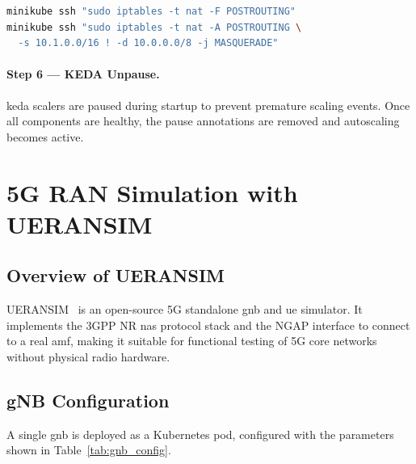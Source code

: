 \begin{lstlisting}[language=bash, caption={Configuring NAT masquerading for UE traffic}, label={lst:iptables_nat}]
minikube ssh "sudo iptables -t nat -F POSTROUTING"
minikube ssh "sudo iptables -t nat -A POSTROUTING \
  -s 10.1.0.0/16 ! -d 10.0.0.0/8 -j MASQUERADE"
\end{lstlisting}

\paragraph{Step 6 — KEDA Unpause.} \gls{keda} scalers are paused during startup to prevent premature scaling events. Once all components are healthy, the pause annotations are removed and autoscaling becomes active.

\section{5G RAN Simulation with UERANSIM}
\label{sec:ueransim_deploy}

\subsection{Overview of UERANSIM}

UERANSIM~\cite{ueransim} is an open-source 5G standalone \gls{gnb} and \gls{ue} simulator. It implements the 3GPP NR \gls{nas} protocol stack and the NGAP interface to connect to a real \gls{amf}, making it suitable for functional testing of 5G core networks without physical radio hardware.

\subsection{gNB Configuration}

A single \gls{gnb} is deployed as a Kubernetes pod, configured with the parameters shown in Table~\ref{tab:gnb_config}.

